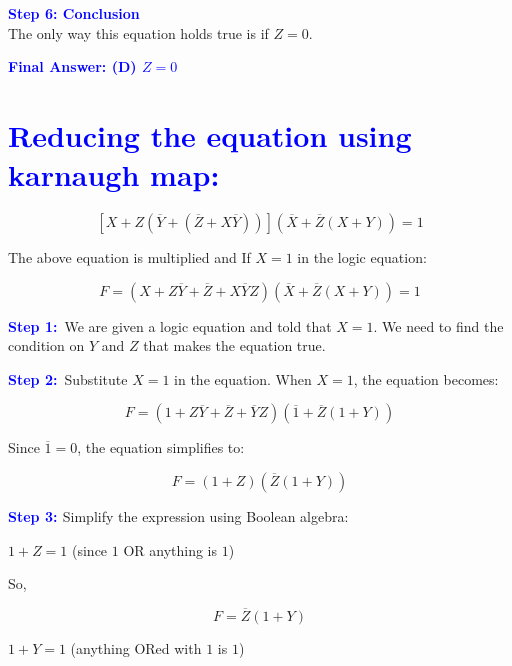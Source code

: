 \documentclass[a4paper,12pt]{article}
\begin{document}
{\vspace{0.3cm}

\textbf{\textcolor{blue}{Step 6: Conclusion}}\\
The only way this equation holds true is if $Z = 0$.

\vspace{1cm}

{\Large\textbf{\textcolor{blue}{{Final Answer: (D) } $Z = 0$}}}

\vspace{0.5cm}

\section*{\textcolor{blue}{Reducing the equation using karnaugh map:}}

\[
\left[ X + Z \left( \overline{Y} + (\overline{Z} + X \overline{Y}) \right) \right] \left( \overline{X} + \overline{Z}(X + Y) \right) = 1
\]

The above equation is multiplied and 
If $X = 1$ in the logic equation:

\[
F = (X + Z \overline{Y} + \overline{Z} + X \overline{Y} Z) (\overline{X} + \overline{Z}(X + Y)) = 1
\]

\vspace{0.3cm}

\textbf{\textcolor{blue}{Step 1:}}\
We are given a logic equation and told that $X = 1$. We need to find the condition on $Y$ and $Z$ that makes the equation true.

\vspace{0.3cm}

\textbf{\textcolor{blue}{Step 2:}}\
Substitute $X = 1$ in the equation. 
When $X = 1$, the equation becomes:

\[
F = (1 + Z \overline{Y} + \overline{Z} + \overline{Y} Z) (\overline{1} + \overline{Z}(1 + Y))
\]

Since $\overline{1} = 0$, the equation simplifies to:

\[
F = (1 + Z) (\overline{Z}(1 + Y))
\]

\vspace{0.3cm}

\textbf{\textcolor{blue}{Step 3: }}Simplify the expression using Boolean algebra:

 $1 + Z = 1$ (since $1$ OR anything is $1$)

So,

\[
F = \overline{Z}(1 + Y)
\]

 $1 + Y = 1$ (anything ORed with $1$ is $1$)

}
\end{document}
